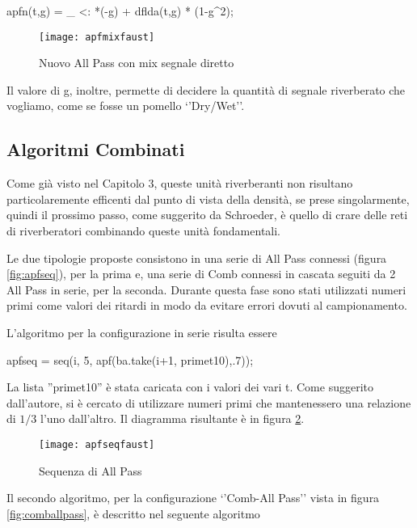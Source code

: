 \begin{code}
apfn(t,g) = _ <: *(-g) + dflda(t,g) * (1-g^2);
\end{code}

\begin{figure}[htp]
\centering
\texttt{[image: apfmixfaust]}
\caption{Nuovo All Pass con mix segnale diretto}
\label{fig:apfmixfaust}
\end{figure}

Il valore di g, inoltre, permette di decidere la quantità di segnale riverberato che vogliamo, come se fosse un pomello `'Dry/Wet''.

\subsection{Algoritmi Combinati}
Come già visto nel Capitolo 3, queste unità riverberanti non risultano particolaremente efficenti dal punto di vista della densità, se prese singolarmente, quindi il prossimo passo, come suggerito da Schroeder, è quello di crare delle reti di riverberatori combinando queste unità fondamentali.

\bigskip

Le due tipologie proposte consistono in una serie di All Pass connessi (figura \ref{fig:apfseq}), per la prima e, una serie di Comb connessi in cascata seguiti da 2 All Pass in serie, per la seconda.
Durante questa fase sono stati utilizzati numeri primi come valori dei ritardi in modo da evitare errori dovuti al campionamento.

L'algoritmo per la configurazione in serie risulta essere

\begin{code}
apfseq =  seq(i, 5, apf(ba.take(i+1, primet10),.7));
\end{code}

La lista ''primet10'' è stata caricata con i valori dei vari t. Come suggerito dall'autore, si è cercato di utilizzare numeri primi che mantenessero una relazione di $1/3$ l'uno dall'altro.
Il diagramma risultante è in figura \ref{fig:apfseqfaust}.

\begin{figure}[htp]
\centering
\texttt{[image: apfseqfaust]}
\caption{Sequenza di All Pass}
\label{fig:apfseqfaust}
\end{figure}

Il secondo algoritmo, per la configurazione `'Comb-All Pass'' vista in figura \ref{fig:comballpass}, è descritto nel seguente algoritmo

